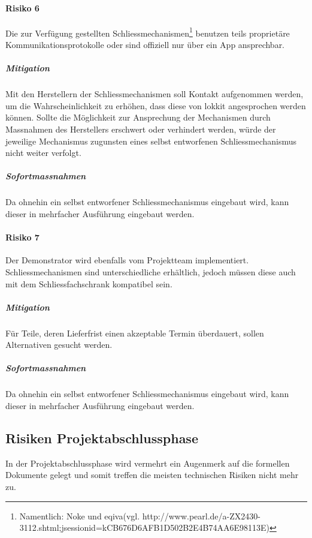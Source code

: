 \paragraph{Risiko 6}
Die zur Verfügung gestellten Schliessmechanismen\footnote{Namentlich: Noke und eqiva(vgl. http://www.pearl.de/a-ZX2430-3112.shtml;jsessionid=kCB676D6AFB1D502B2E4B74AA6E98113E)} benutzen teils proprietäre Kommunikationsprotokolle oder sind offiziell nur über ein App ansprechbar.
\subparagraph{Mitigation}
Mit den Herstellern der Schliessmechanismen soll Kontakt aufgenommen werden, um die Wahrscheinlichkeit zu erhöhen, dass diese von lokkit angesprochen werden können. Sollte die Möglichkeit zur Ansprechung der Mechanismen durch Massnahmen des Herstellers erschwert oder verhindert werden, würde der jeweilige Mechanismus zugunsten eines selbst entworfenen Schliessmechanismus nicht weiter verfolgt.
\subparagraph{Sofortmassnahmen}
Da ohnehin ein selbst entworfener Schliessmechanismus eingebaut wird, kann dieser in mehrfacher Ausführung eingebaut werden.

\paragraph{Risiko 7}
Der Demonstrator wird ebenfalls vom Projektteam implementiert. Schliessmechanismen sind unterschiedliche erhältlich, jedoch müssen diese auch mit dem Schliessfachschrank kompatibel sein.
\subparagraph{Mitigation}
Für Teile, deren Lieferfrist einen akzeptable Termin überdauert, sollen Alternativen gesucht werden.
\subparagraph{Sofortmassnahmen}
Da ohnehin ein selbst entworfener Schliessmechanismus eingebaut wird, kann dieser in mehrfacher Ausführung eingebaut werden.


\subsection{Risiken Projektabschlussphase}
In der Projektabschlussphase wird vermehrt ein Augenmerk auf die formellen Dokumente gelegt und somit treffen die meisten technischen Risiken nicht mehr zu.

